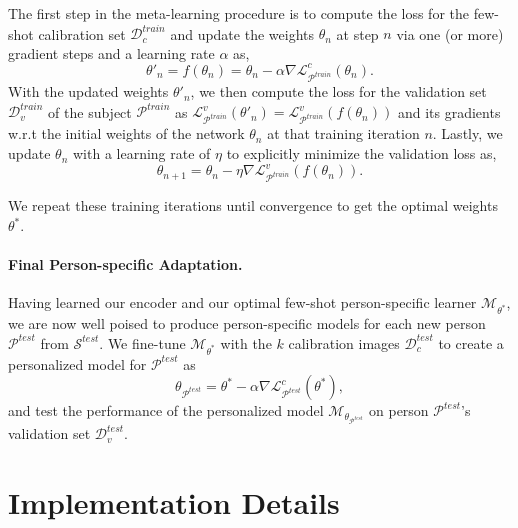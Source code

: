 \documentclass[10pt,twocolumn,letterpaper]{article}
\begin{document}
The first step in the meta-learning procedure is to compute the loss for the few-shot calibration set $\mathcal{D}_c^{train}$ and update the weights $\theta_n$ at step $n$ via one (or more) gradient steps and a learning rate $\alpha$ as,
\begin{equation} \label{eq:update1}
    \theta'_n = f(\theta_n) = \theta_n - \alpha \nabla\mathcal{L}_{\mathcal{P}^{train}}^c(\theta_n).
\end{equation}
With the updated weights $\theta'_n$, we then compute the loss for the validation set $\mathcal{D}_v^{train}$ of the subject $\mathcal{P}^{train}$  as $\mathcal{L}_{\mathcal{P}^{train}}^v(\theta'_n) = \mathcal{L}_{\mathcal{P}^{train}}^v(f(\theta_n))$ and its gradients w.r.t the initial weights of the network $\theta_n$ at that training iteration $n$. Lastly, we update $\theta_n$ with a learning rate of $\eta$ to explicitly minimize the validation loss as,
\begin{equation} \label{eq:update2}
    \theta_{n+1} = \theta_n - \eta \nabla\mathcal{L}_{\mathcal{P}^{train}}^{v}(f(\theta_n)).
\end{equation}

We repeat these training iterations until convergence to get the optimal weights $\theta^*$.







\paragraph{Final Person-specific Adaptation.}
Having learned our encoder and our optimal few-shot person-specific learner $\mathcal{M}_{\theta^*}$, we are now well poised to produce person-specific models for each new person $\mathcal{P}^{test}$ from $\mathcal{S}^{test}$. We fine-tune $\mathcal{M}_{\theta^*}$ with the $k$ calibration images $\mathcal{D}_c^{test}$ to create a personalized model for $\mathcal{P}^{test}$ as
\begin{equation} \label{eq:update_final}
    \theta_{\mathcal{P}^{test}} = \theta^* - \alpha \nabla\mathcal{L}_{\mathcal{P}^{test}}^{c}(\theta^*), 
\end{equation}
and test the performance of the personalized model $\mathcal{M}_{\theta_{\mathcal{P}^{test}}}$ on person $\mathcal{P}^{test}$'s validation set $\mathcal{D}_v^{test}$.






\section{Implementation Details}
\end{document}
